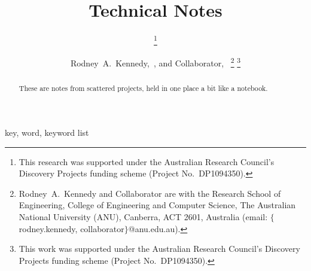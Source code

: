 \documentclass[10pt, twocolumn, twoside]{IEEEtran}
\begin{document}
\title{Technical Notes}

\ifCLASSOPTIONconference
	\author{
			\thanks{This research was supported under the Australian Research Council's Discovery Projects
				funding scheme (Project No.~DP1094350).}
		 \and
		}
\else
	\author{Rodney~A.~Kennedy,~, and
		Collaborator,~
		\thanks{Rodney~A.~Kennedy and Collaborator are with the Research School of Engineering,
			College of Engineering and Computer Science,
			The Australian National University (ANU), Canberra, ACT 2601, Australia
			(email: $\{$rodney.kennedy, collaborator$\}$@anu.edu.au).}
		\thanks{This work was supported under the Australian Research Council's Discovery Projects
			funding scheme (Project No.~DP1094350).}}
\fi


\maketitle

\newcommand{\R}{\mathscr{R}}
\newcommand{\taper}{w}%

\newcommand{\chfn}{\chi_{\R}^{\vphantom{g}}}

\begin{abstract}
These are notes from scattered projects, held in one place a bit like a notebook.
\end{abstract}

\smallskip
\begin{IEEEkeywords}
key, word, keyword list
\end{IEEEkeywords}

\IEEEpeerreviewmaketitle
\end{document}
